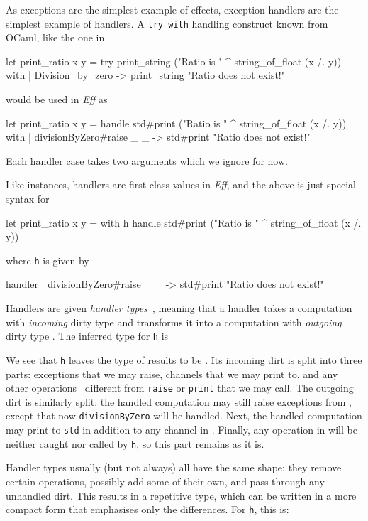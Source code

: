 \documentclass{LMCS}
\newcommand{\Eff}{\emph{Eff}\xspace}
\let\inline\lstinline
\begin{document}
As exceptions are the simplest example of effects,
exception handlers are the simplest example of handlers.
A \inline{try with} handling construct known from OCaml, like the one in
\begin{source}
  let print_ratio x y =
    try
      print_string ("Ratio is " ^ string_of_float (x /. y))
    with
    | Division_by_zero -> print_string "Ratio does not exist!"
\end{source}
would be used in \Eff as
\begin{source}
  let print_ratio x y =
    handle
      std#print ("Ratio is " ^ string_of_float (x /. y))
    with
    | divisionByZero#raise _ _ -> std#print "Ratio does not exist!"
\end{source}
Each handler case takes two arguments which we ignore for now.

Like instances, handlers are first-class values in \Eff,
and the above is just special syntax for
\begin{source}
  let print_ratio x y =
    with h handle
      std#print ("Ratio is " ^ string_of_float (x /. y))
\end{source}
where \inline{h} is given by
\begin{source}
  handler
  | divisionByZero#raise _ _ -> std#print "Ratio does not exist!"
\end{source}
Handlers are given \emph{handler types~},
meaning that a handler takes a computation with \emph{incoming} dirty type 
and transforms it into a computation with \emph{outgoing} dirty type .
The inferred type for \inline{h} is

We see that \inline{h} leaves the type of results to be .
Its incoming dirt is split into three parts:
exceptions  that we may raise,
channels  that we may print to,
and any other operations~ different from \inline{raise} or \inline{print} that we may call.
The outgoing dirt is similarly split:
the handled computation may still raise exceptions from ,
except that now \inline{divisionByZero} will be handled.
Next, the handled computation may print to \inline{std} in addition to any channel in .
Finally, any operation in  will be neither caught nor called by \inline{h},
so this part remains as it is.

Handler types usually (but not always) all have the same shape:
they remove certain operations,
possibly add some of their own,
and pass through any unhandled dirt.
This results in a repetitive type, which can be written in a more compact form
that emphasises only the differences.
For \inline{h}, this is:
\end{document}
